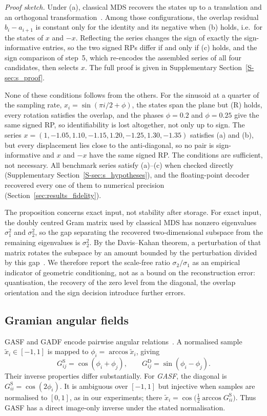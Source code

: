\documentclass[preprint,review,12pt]{elsarticle}
\begin{document}
\noindent\emph{Proof sketch.} Under (a), classical MDS recovers the states up to a translation and an orthogonal transformation~\cite{Torgerson1952}. Among those configurations, the overlap residual $b_i-a_{i+1}$ is constant only for the identity and its negative when (b) holds, i.e.\ for the states of $x$ and $-x$. Reflecting the series changes the sign of exactly the sign-informative entries, so the two signed RPs differ if and only if (c) holds, and the sign comparison of step~5, which re-encodes the assembled series of all four candidates, then selects $x$. The full proof is given in Supplementary Section~\ref{S-sec:s_proof}.

None of these conditions follows from the others. For the sinusoid at a quarter of the sampling rate, $x_i=\sin(\pi i/2+\phi)$, the states span the plane but (R) holds, every rotation satisfies the overlap, and the phases $\phi=0.2$ and $\phi=0.25$ give the same signed RP, so identifiability is lost altogether, not only up to sign. The series $x=(1,-1.05,1.10,-1.15,1.20,-1.25,1.30,-1.35)$ satisfies (a) and (b), but every displacement lies close to the anti-diagonal, so no pair is sign-informative and $x$ and $-x$ have the same signed RP. The conditions are sufficient, not necessary. All \hypSeries{} benchmark series satisfy (a)--(c) when checked directly (Supplementary Section~\ref{S-sec:s_hypotheses}), and the floating-point decoder recovered every one of them to numerical precision (Section~\ref{sec:results_fidelity}).

The proposition concerns exact input, not stability after storage. For exact input, the doubly centred Gram matrix used by classical MDS has nonzero eigenvalues $\sigma_1^2$ and $\sigma_2^2$, so the gap separating the recovered two-dimensional subspace from the remaining eigenvalues is $\sigma_2^2$. By the Davis--Kahan theorem, a perturbation of that matrix rotates the subspace by an amount bounded by the perturbation divided by this gap~\cite{davis1970rotation}. We therefore report the scale-free ratio $\sigma_2/\sigma_1$ as an empirical indicator of geometric conditioning, not as a bound on the reconstruction error: quantisation, the recovery of the zero level from the diagonal, the overlap orientation and the sign decision introduce further errors.

\subsection{Gramian angular fields}

GASF and GADF encode pairwise angular relations~\cite{wang2015encoding}. A normalised sample $\tilde x_i\in[-1,1]$ is mapped to $\phi_i=\arccos\tilde x_i$, giving
\[
G^{\mathrm S}_{ij}=\cos(\phi_i+\phi_j),\qquad
G^{\mathrm D}_{ij}=\sin(\phi_i-\phi_j).
\]
Their inverse properties differ substantially. For \emph{GASF}, the diagonal is $G^{\mathrm S}_{ii}=\cos(2\phi_i)$. It is ambiguous over $[-1,1]$ but injective when samples are normalised to $[0,1]$, as in our experiments; there $\tilde x_i=\cos\!\bigl(\tfrac12\arccos G^{\mathrm S}_{ii}\bigr)$. Thus GASF has a direct image-only inverse under the stated normalisation.
\end{document}
